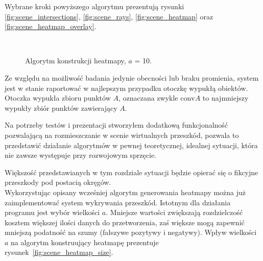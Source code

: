 Wybrane kroki powyższego algorytmu prezentują rysunki \ref{fig:scene_intersections}, \ref{fig:scene_rays}, \ref{fig:scene_heatmap} oraz \ref{fig:scene_heatmap_overlay}.

\begin{sidewaysfigure}[tbh]
  \myfloatalign
   \quad
   \\
   \quad
  \caption[Algorytm konstrukcji heatmapy]{Algorytm konstrukcji heatmapy, $a$ = 10.}\label{fig:scene_heatmap_algorithm}
\end{sidewaysfigure}

Ze względu na możliwość badania jedynie obecności lub braku promienia, system jest w stanie raportować w najlepszym przypadku otoczkę wypukłą obiektów. Otoczka wypukła zbioru punktów $A$, oznaczana zwykle $\mbox{conv} A$ to najmniejszy wypukły zbiór punktów zawierający $A$.\\

\clearpage

Na potrzeby testów i prezentacji stworzyłem dodatkową funkcjonalność pozwalającą na rozmieszczanie w scenie wirtualnych przeszkód, pozwala to przedstawić działanie algorytmów w pewnej teoretycznej, idealnej sytuacji, która nie zawsze występuje przy rozwojowym sprzęcie.

Większość przedstawianych w tym rozdziale sytuacji będzie opierać się o fikcyjne przeszkody pod postacią okręgów.\\

Wykorzystując opisany wcześniej algorytm generowania heatmapy można już zaimplementować system wykrywania przeszkód. Istotnym dla działania programu jest wybór wielkości $a$. Mniejsze wartości zwiększają rozdzielczość kosztem większej ilości danych do przetworzenia, zaś większe mogą zapewnić mniejszą podatność na szumy (fałszywe pozytywy i negatywy). Wpływ wielkości $a$ na algorytm konstruujący heatmapę prezentuje rysunek~\ref{fig:scene_heatmap_size}.

